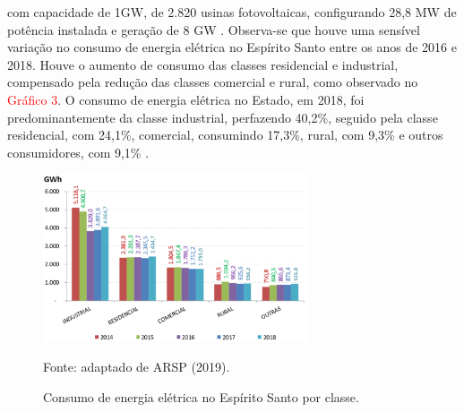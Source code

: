 \begin{onehalfspace}
    com capacidade de 1GW, de 2.820 usinas fotovoltaicas, configurando 28,8 MW de potência instalada 
    e geração de 8 GW \cite{AgenciadeRegulacaodeServicosPublicosdoEspiritoSanto-ARSP2018}.\vspace{0.3cm} \newline
    Observa-se que houve uma sensível variação no consumo de energia elétrica no Espírito Santo 
    entre os anos de 2016 e 2018. Houve o aumento de consumo das classes residencial e industrial, 
    compensado pela redução das classes comercial e rural, como observado no \textcolor{red}{Gráfico 3}. O consumo de 
    energia elétrica no Estado, em 2018, foi predominantemente da classe industrial, perfazendo 
    40,2\%, seguido pela classe residencial, com 24,1\%, comercial, consumindo 17,3\%, rural, 
    com 9,3\% e outros consumidores, com 9,1\% \cite{AgenciadeRegulacaodeServicosPublicosdoEspiritoSanto-ARSP2019}.
    
    \begin{figure}[ht]
        \centering
        \caption{\small Consumo de energia elétrica no Espírito Santo por classe.}
        \includegraphics[width=0.7\textwidth]{graphs/graph3_consumo_de_energia_eletrica_no_es_por_classe-arsp_2019.png}
        \par \small Fonte: adaptado de ARSP (2019).
        \label{Grafico 3}
    \end{figure}\vspace*{-0.1cm}


\end{onehalfspace}
